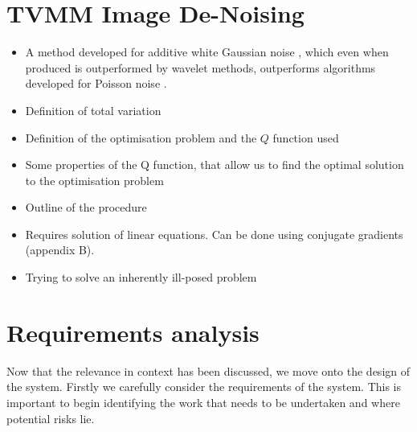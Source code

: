 \documentclass[12pt,twoside,notitlepage]{report}
\begin{document}
    \section{TVMM Image De-Noising}
        \begin{framed}
        \begin{itemize}
            \item A method developed for additive white Gaussian noise \cite{figueiredo2006total}, which even when produced 
                is outperformed by wavelet methods, outperforms algorithms developed for Poisson noise \cite{rodrigues2008denoising}.
            \item Definition of total variation
            \item Definition of the optimisation problem and the $Q$ function used
            \item Some properties of the Q function, that allow us to find the optimal solution to the optimisation problem
            \item Outline of the procedure
            \item Requires solution of linear equations. Can be done using conjugate gradients (appendix B).
            \item Trying to solve an inherently ill-posed problem
        \end{itemize}
        \end{framed}



    \section{Requirements analysis}
        Now that the relevance in context has been discussed, we move onto the design of the system. Firstly we carefully consider 
        the requirements of the system. This is important to begin identifying the work that needs to be undertaken 
        and where potential risks lie. 
\end{document}
